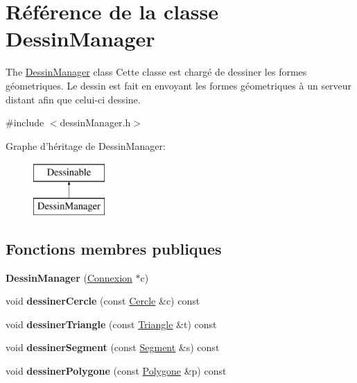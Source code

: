 \hypertarget{class_dessin_manager}{\section{Référence de la classe Dessin\+Manager}
\label{class_dessin_manager}
}


The \hyperlink{class_dessin_manager}{Dessin\+Manager} class Cette classe est chargé de dessiner les formes géometriques. Le dessin est fait en envoyant les formes géometriques à un serveur distant afin que celui-\/ci dessine.  




{\ttfamily \#include $<$dessin\+Manager.\+h$>$}

Graphe d'héritage de Dessin\+Manager\+:\begin{figure}[H]
\begin{center}
\leavevmode
\includegraphics[height=2.000000cm]{class_dessin_manager}
\end{center}
\end{figure}
\subsection*{Fonctions membres publiques}
\begin{DoxyCompactItemize}
\item 
\hypertarget{class_dessin_manager_ac3fc2fa6c1ac46893076b6b4529b8511}{{\bfseries Dessin\+Manager} (\hyperlink{class_connexion}{Connexion} $\ast$c)}\label{class_dessin_manager_ac3fc2fa6c1ac46893076b6b4529b8511}

\item 
\hypertarget{class_dessin_manager_a14bbe90859f8171cdfaca8c7dd9120f7}{void {\bfseries dessiner\+Cercle} (const \hyperlink{class_cercle}{Cercle} \&c) const }\label{class_dessin_manager_a14bbe90859f8171cdfaca8c7dd9120f7}

\item 
\hypertarget{class_dessin_manager_a3b85589740f0972fdb6eb74967138c28}{void {\bfseries dessiner\+Triangle} (const \hyperlink{class_triangle}{Triangle} \&t) const }\label{class_dessin_manager_a3b85589740f0972fdb6eb74967138c28}

\item 
\hypertarget{class_dessin_manager_a84cad5d36cbafc15a8ec6d8ae73c85e7}{void {\bfseries dessiner\+Segment} (const \hyperlink{class_segment}{Segment} \&s) const }\label{class_dessin_manager_a84cad5d36cbafc15a8ec6d8ae73c85e7}

\item 
\hypertarget{class_dessin_manager_a47890198c16e30889abc5ce90fd24ad9}{void {\bfseries dessiner\+Polygone} (const \hyperlink{class_polygone}{Polygone} \&p) const }\label{class_dessin_manager_a47890198c16e30889abc5ce90fd24ad9}

\end{DoxyCompactItemize}



